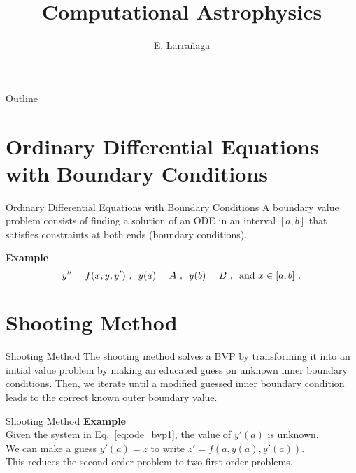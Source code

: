 \documentclass[11pt]{beamer}
\begin{document}
\begin{frame}
\title{Computational Astrophysics}
\author{E. Larrañaga}
\titlepage
\end{frame}

\begin{frame}{Outline}
\tableofcontents
\end{frame}

\section{Ordinary Differential Equations with Boundary Conditions}
\begin{frame}[fragile]{Ordinary Differential Equations with Boundary Conditions}
A boundary
value problem consists of finding a solution of an ODE
in an interval $[a,b]$ that satisfies constraints at both
ends (boundary conditions).

\textbf{Example}
\begin{equation}
y'' = f(x,y,y')\,\,, 
\hspace{0.5em} y(a) = A\,\,,
\hspace{0.5em} y(b) = B\,\,, 
\hspace{0.5em} \text{and } x \in [a,b]\,\,.
\label{eq:ode_bvp1}
\end{equation}
\end{frame}


\section{Shooting Method}
\begin{frame}[fragile]{Shooting Method}
The shooting method solves a BVP  by transforming it into an initial value problem by
making an educated guess on unknown inner boundary conditions. Then, we iterate
 until a modified guessed inner boundary condition leads to
the correct known outer boundary value.
\end{frame}

\begin{frame}[fragile]{Shooting Method}
\textbf{Example}\\
 
Given the system in Eq.~\ref{eq:ode_bvp1}, the value of $y'(a)$ is
unknown.\\

We can make a guess $y'(a) = z$ to write $z' = f(a,y(a),y'(a))$. \\

This reduces
the second-order problem to two first-order problems. 
\end{frame}
\end{document}
